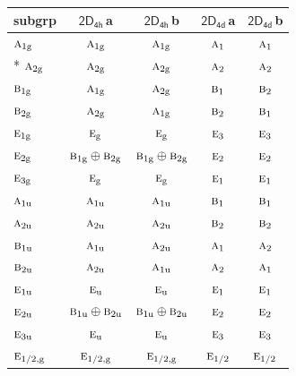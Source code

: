 \documentclass[10pt,a4paper]{article}
\numberwithin{equation}{section}
\newcommand{\grp}[1]{\mathsf{#1}}
\newcommand{\irr}[1]{\text{\normalfont\scshape #1}}
\newcommand{\ptag}[1]{\mathrm{#1}}
\newcommand{\clsletter}[1]{\,{\scriptsize\color{black!55}#1}}
\begin{document}
{\small\begin{longtable}{@{}lcccc@{}}\toprule
subgrp & \href{2D4h.pdf}{$\grp{2D_{4h}}$}\clsletter{a} & \href{2D4h.pdf}{$\grp{2D_{4h}}$}\clsletter{b} & \href{2D4d.pdf}{$\grp{2D_{4d}}$}\clsletter{a} & \href{2D4d.pdf}{$\grp{2D_{4d}}$}\clsletter{b}\\\midrule\endhead
\bottomrule\endfoot\endlastfoot
$\irr{a}_{1\ptag{g}}$ & $\irr{a}_{1\ptag{g}}$ & $\irr{a}_{1\ptag{g}}$ & $\irr{a}_{1}$ & $\irr{a}_{1}$\\*
$\irr{a}_{2\ptag{g}}$ & $\irr{a}_{2\ptag{g}}$ & $\irr{a}_{2\ptag{g}}$ & $\irr{a}_{2}$ & $\irr{a}_{2}$\\
$\irr{b}_{1\ptag{g}}$ & $\irr{a}_{1\ptag{g}}$ & $\irr{a}_{2\ptag{g}}$ & $\irr{b}_{1}$ & $\irr{b}_{2}$\\
$\irr{b}_{2\ptag{g}}$ & $\irr{a}_{2\ptag{g}}$ & $\irr{a}_{1\ptag{g}}$ & $\irr{b}_{2}$ & $\irr{b}_{1}$\\
$\irr{e}_{1\ptag{g}}$ & $\irr{e}_{\ptag{g}}$ & $\irr{e}_{\ptag{g}}$ & $\irr{e}_{3}$ & $\irr{e}_{3}$\\
$\irr{e}_{2\ptag{g}}$ & $\irr{b}_{1\ptag{g}}\oplus \irr{b}_{2\ptag{g}}$ & $\irr{b}_{1\ptag{g}}\oplus \irr{b}_{2\ptag{g}}$ & $\irr{e}_{2}$ & $\irr{e}_{2}$\\
$\irr{e}_{3\ptag{g}}$ & $\irr{e}_{\ptag{g}}$ & $\irr{e}_{\ptag{g}}$ & $\irr{e}_{1}$ & $\irr{e}_{1}$\\
$\irr{a}_{1\ptag{u}}$ & $\irr{a}_{1\ptag{u}}$ & $\irr{a}_{1\ptag{u}}$ & $\irr{b}_{1}$ & $\irr{b}_{1}$\\
$\irr{a}_{2\ptag{u}}$ & $\irr{a}_{2\ptag{u}}$ & $\irr{a}_{2\ptag{u}}$ & $\irr{b}_{2}$ & $\irr{b}_{2}$\\
$\irr{b}_{1\ptag{u}}$ & $\irr{a}_{1\ptag{u}}$ & $\irr{a}_{2\ptag{u}}$ & $\irr{a}_{1}$ & $\irr{a}_{2}$\\
$\irr{b}_{2\ptag{u}}$ & $\irr{a}_{2\ptag{u}}$ & $\irr{a}_{1\ptag{u}}$ & $\irr{a}_{2}$ & $\irr{a}_{1}$\\
$\irr{e}_{1\ptag{u}}$ & $\irr{e}_{\ptag{u}}$ & $\irr{e}_{\ptag{u}}$ & $\irr{e}_{1}$ & $\irr{e}_{1}$\\
$\irr{e}_{2\ptag{u}}$ & $\irr{b}_{1\ptag{u}}\oplus \irr{b}_{2\ptag{u}}$ & $\irr{b}_{1\ptag{u}}\oplus \irr{b}_{2\ptag{u}}$ & $\irr{e}_{2}$ & $\irr{e}_{2}$\\
$\irr{e}_{3\ptag{u}}$ & $\irr{e}_{\ptag{u}}$ & $\irr{e}_{\ptag{u}}$ & $\irr{e}_{3}$ & $\irr{e}_{3}$\\
$\irr{e}_{1/2,\ptag{g}}$ & $\irr{e}_{1/2,\ptag{g}}$ & $\irr{e}_{1/2,\ptag{g}}$ & $\irr{e}_{1/2}$ & $\irr{e}_{1/2}$\\

\end{longtable}}
\end{document}
